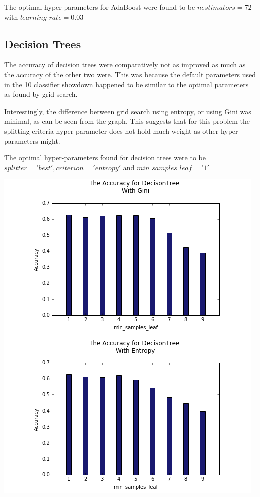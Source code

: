 \documentclass{article}
\begin{document}
The optimal hyper-parameters for AdaBoost were found to be $n$\textunderscore $estimators = 72$ with $learning$ \textunderscore $rate = 0.03$

\subsection{Decision Trees}




The accuracy of decision trees were comparatively not as improved as much as the accuracy of the other two were. This was because the default parameters used in the 10 classifier showdown \cite{showdown} happened to be similar to the optimal parameters as found by grid search. 

Interestingly, the difference between grid search using entropy, or using Gini was minimal, as can be seen from the graph. This suggests that for this problem the splitting criteria hyper-parameter does not hold much weight as other hyper-parameters might. 

The optimal hyper-parameters found for decision trees were to be $splitter = 'best', criterion = 'entropy'$ and $min$ \textunderscore $samples$ \textunderscore $leaf = '1'$

\includegraphics[scale=0.6]{d_trees_crop}
\end{document}
